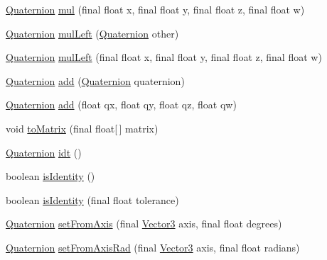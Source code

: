 \begin{DoxyCompactItemize}
\item 
\hyperlink{classairhockeyjava_1_1util_1_1_quaternion}{Quaternion} \hyperlink{classairhockeyjava_1_1util_1_1_quaternion_a2ed1c0658dd46fec3b92470b64277445}{mul} (final float x, final float y, final float z, final float w)
\item 
\hyperlink{classairhockeyjava_1_1util_1_1_quaternion}{Quaternion} \hyperlink{classairhockeyjava_1_1util_1_1_quaternion_a0b179e29f4af9633e8b8722821114586}{mul\+Left} (\hyperlink{classairhockeyjava_1_1util_1_1_quaternion}{Quaternion} other)
\item 
\hyperlink{classairhockeyjava_1_1util_1_1_quaternion}{Quaternion} \hyperlink{classairhockeyjava_1_1util_1_1_quaternion_ae068a563833e36387bd3b660313c3988}{mul\+Left} (final float x, final float y, final float z, final float w)
\item 
\hyperlink{classairhockeyjava_1_1util_1_1_quaternion}{Quaternion} \hyperlink{classairhockeyjava_1_1util_1_1_quaternion_abcb7ff0f5d11a8ee134a80d4d37a2e07}{add} (\hyperlink{classairhockeyjava_1_1util_1_1_quaternion}{Quaternion} quaternion)
\item 
\hyperlink{classairhockeyjava_1_1util_1_1_quaternion}{Quaternion} \hyperlink{classairhockeyjava_1_1util_1_1_quaternion_ad2d6126697bb6ed2cba0c44da29bb086}{add} (float qx, float qy, float qz, float qw)
\item 
void \hyperlink{classairhockeyjava_1_1util_1_1_quaternion_a48cfdc875ba716716e1bae3d90dbfe3b}{to\+Matrix} (final float\mbox{[}$\,$\mbox{]} matrix)
\item 
\hyperlink{classairhockeyjava_1_1util_1_1_quaternion}{Quaternion} \hyperlink{classairhockeyjava_1_1util_1_1_quaternion_a2e970de1de2bc26eb76072da93523518}{idt} ()
\item 
boolean \hyperlink{classairhockeyjava_1_1util_1_1_quaternion_a56a1423144d9c5bde1a5ccf0464a5cca}{is\+Identity} ()
\item 
boolean \hyperlink{classairhockeyjava_1_1util_1_1_quaternion_ab09099c71d431fc65be82f964363d037}{is\+Identity} (final float tolerance)
\item 
\hyperlink{classairhockeyjava_1_1util_1_1_quaternion}{Quaternion} \hyperlink{classairhockeyjava_1_1util_1_1_quaternion_a89da7f1a38a3ebd8514749d3ead6ed1f}{set\+From\+Axis} (final \hyperlink{classairhockeyjava_1_1util_1_1_vector3}{Vector3} axis, final float degrees)
\item 
\hyperlink{classairhockeyjava_1_1util_1_1_quaternion}{Quaternion} \hyperlink{classairhockeyjava_1_1util_1_1_quaternion_a5eb18f3b105e8a51a82252253180a00b}{set\+From\+Axis\+Rad} (final \hyperlink{classairhockeyjava_1_1util_1_1_vector3}{Vector3} axis, final float radians)

\end{DoxyCompactItemize}
